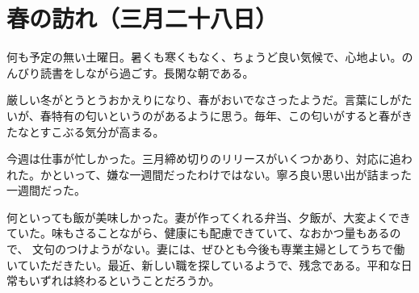 \chapter{春の訪れ（三月二十八日）}

何も予定の無い土曜日。暑くも寒くもなく、ちょうど良い気候で、心地よい。のんびり読書をしながら過ごす。長閑な朝である。

厳しい冬がとうとうおかえりになり、春がおいでなさったようだ。言葉にしがたいが、春特有の匂いというのがあるように思う。毎年、この匂いがすると春がきたなとすこぶる気分が高まる。

今週は仕事が忙しかった。三月締め切りのリリースがいくつかあり、対応に追われた。かといって、嫌な一週間だったわけではない。寧ろ良い思い出が詰まった一週間だった。

何といっても飯が美味しかった。妻が作ってくれる弁当、夕飯が、大変よくできていた。味もさることながら、健康にも配慮できていて、なおかつ量もあるので、
文句のつけようがない。妻には、ぜひとも今後も専業主婦としてうちで働いていただきたい。最近、新しい職を探しているようで、残念である。平和な日常もいずれは終わるということだろうか。
